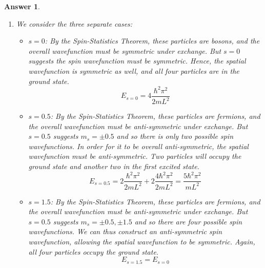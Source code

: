 \documentclass[a4paper]{article}
\newtheorem{ans}{Answer}[subsection]
\theoremstyle{new}
\begin{document}
\begin{ans}
\begin{enumerate}[label=(\roman*)]
$$\langle x^2\rangle=\frac{2}{L}\int_0^Lx^2\sin^2\frac{\pi x}{L}dx=\frac{1}{L}\int_0^L x^2-x^2\cos\frac{2\pi x}{L}dx=\frac{1}{L}\frac{1}{3}L^3-\frac{l^2}{2\pi^2}=L\bigg(\frac{1}{3}-\frac{1}{2\pi^2}\bigg)$$
$$\langle p\rangle=\frac{2}{L}\frac{\hbar}{i}\int_0^L\sin\frac{\pi x}{L}\frac{\pi}{L}\cos\frac{\pi x}{L}dx=0$$
$$\langle p^2\rangle=-\frac{2}{L}\frac{\hbar}{i}\frac{\hbar}{i}\int_0^L\sin\frac{\pi x}{L}\frac{\pi^2}{L^2}\sin\frac{\pi x}{L}dx=\frac{\hbar^2\pi^2}{L^2}$$
The uncertainties will be 
$$\Delta x=\sqrt{\langle x^2\rangle-\langle x\rangle^2}=L\sqrt{\frac{1}{12}-\frac{1}{2\pi^2}}$$
$$\Delta p=\frac{\hbar\pi}{L}$$
and thus $\Delta x\Delta p=\frac{\hbar}{2}\sqrt{\frac{\pi^2}{3}-2}\geq\frac{\hbar}{2}$, and thus satisfy the constraint set by the Uncertainty principle.
\item We consider the three separate cases:
\begin{itemize}
    \item $s=0$: By the Spin-Statistics Theorem, these particles are bosons, and the overall wavefunction must be symmetric under exchange. But $s=0$ suggests the spin wavefunction must be symmetric. Hence, the spatial wavefunction is symmetric as well, and all four particles are in the ground state.
    $$E_{s=0}=4\frac{\hbar^2\pi^2}{2mL^2}$$
    \item $s=0.5$: By the Spin-Statistics Theorem, these particles are fermions, and the overall wavefunction must be anti-symmetric under exchange. But $s=0.5$ suggests $m_s=\pm0.5$ and so there is only two possible spin wavefunctions. In order for it to be overall anti-symmetric, the spatial wavefunction must be anti-symmetric. Two particles will occupy the ground state and another two in the first excited state.
    $$E_{s=0.5}=2\frac{\hbar^2\pi^2}{2mL^2}+2\frac{4\hbar^2\pi^2}{2mL^2}=\frac{5\hbar^2\pi^2}{mL^2}$$
    \item $s=1.5$: By the Spin-Statistics Theorem, these particles are fermions, and the overall wavefunction must be anti-symmetric under exchange. But $s=0.5$ suggests $m_s=\pm0.5,\pm1.5$ and so there are four possible spin wavefunctions. We can thus construct an anti-symmetric spin wavefunction, allowing the spatial wavefunction  to be symmetric. Again, all four particles occupy the ground state.
    $$E_{s=1.5}=E_{s=0}$$
\end{itemize}
\end{enumerate}
\end{ans}
\newpage
\end{document}
